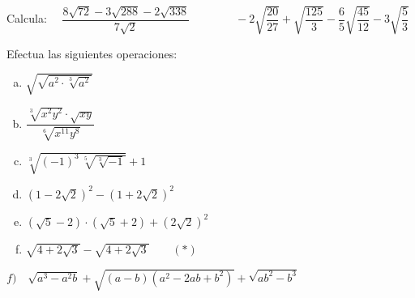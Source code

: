 \vspace{-8mm}
\begin{flushright}
\begin{footnotesize} \textcolor{gris}{}	\end{footnotesize}
\end{flushright}


\begin{mipropuesto}
	
	Calcula: $\quad \dfrac{8\sqrt{72}-3\sqrt{288}-2\sqrt{338}}{7\sqrt{2}} \qquad \qquad  -2\sqrt{\dfrac{20}{27}} +\sqrt{\dfrac{125}{3}}-\dfrac 6 5 \sqrt{\dfrac{45}{12}}-3 \sqrt{\dfrac 5 3}$
\end{mipropuesto}

\vspace{-8mm}
\begin{flushright}
\begin{footnotesize} \textcolor{gris}{}	\end{footnotesize}
\end{flushright}


\begin{mipropuesto}
	
	Efectua las siguientes operaciones:
\begin{multicols}{2}	
	\begin{enumerate}[a) ]
	\item 	$\sqrt{\sqrt{a^2\cdot \sqrt[3]{a^2}}}$
	\item $\dfrac{\sqrt[3]{x^2y^2}\cdot \sqrt{xy}}{\sqrt[6]{x^11y^8}}$
	\item   $\sqrt[3]{(-1)^3\, \sqrt[5]{\sqrt[3]{-1}}}+1$
	\item $(1-2\sqrt{2})^2-(1+2\sqrt{2})^2$
	\item $(\sqrt{5}-2)\cdot (\sqrt{5}+2)+(2\sqrt{2})^2$
	\item $\sqrt{4+2\sqrt{3}}-\sqrt{4+2\sqrt{3}}\qquad (*)$
	\end{enumerate}
\end{multicols}
$f)\quad \sqrt{a^3-a^2b}+\sqrt{(a-b)(a^2-2ab+b^2)}+\sqrt{ab^2-b^3}$
\vspace{1mm}
\end{mipropuesto}



\vspace{-8mm}
\begin{flushright}
\begin{footnotesize} \textcolor{gris}{}	\end{footnotesize}
\end{flushright}


